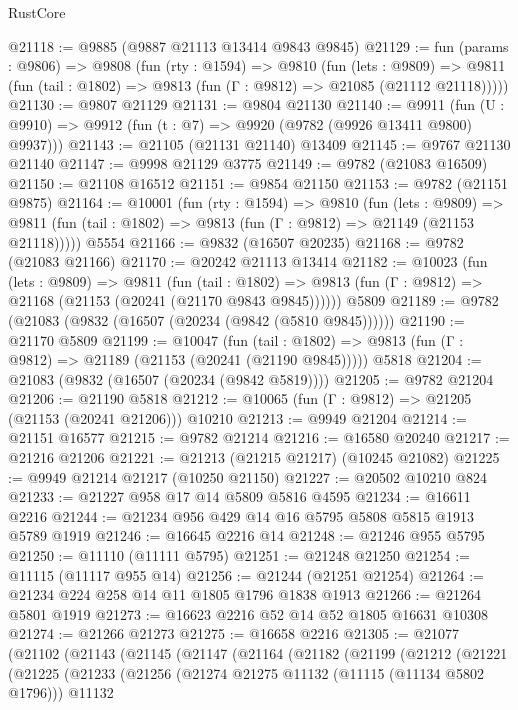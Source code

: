\begin{lexlean}{RustCore}
\begin{coremodule}
@21118 := @9885 (@9887 @21113 @13414 @9843 @9845)
@21129 := fun (params : @9806) =>
  @9808
    (fun (rty : @1594) =>
    @9810
      (fun (lets : @9809) =>
      @9811 (fun (tail : @1802) => @9813 (fun (Γ : @9812) => @21085 (@21112 @21118)))))
@21130 := @9807 @21129
@21131 := @9804 @21130
@21140 := @9911
    (fun (U : @9910) => @9912 (fun (t : @7) => @9920 (@9782 (@9926 @13411 @9800) @9937)))
@21143 := @21105 (@21131 @21140) @13409
@21145 := @9767 @21130 @21140
@21147 := @9998 @21129 @3775
@21149 := @9782 (@21083 @16509)
@21150 := @21108 @16512
@21151 := @9854 @21150
@21153 := @9782 (@21151 @9875)
@21164 := @10001
    (fun (rty : @1594) =>
    @9810
      (fun (lets : @9809) =>
      @9811 (fun (tail : @1802) => @9813 (fun (Γ : @9812) => @21149 (@21153 @21118)))))
    @5554
@21166 := @9832 (@16507 @20235)
@21168 := @9782 (@21083 @21166)
@21170 := @20242 @21113 @13414
@21182 := @10023
    (fun (lets : @9809) =>
    @9811
      (fun (tail : @1802) =>
      @9813 (fun (Γ : @9812) => @21168 (@21153 (@20241 (@21170 @9843 @9845))))))
    @5809
@21189 := @9782 (@21083 (@9832 (@16507 (@20234 (@9842 (@5810 @9845))))))
@21190 := @21170 @5809
@21199 := @10047
    (fun (tail : @1802) => @9813 (fun (Γ : @9812) => @21189 (@21153 (@20241 (@21190 @9845)))))
    @5818
@21204 := @21083 (@9832 (@16507 (@20234 (@9842 @5819))))
@21205 := @9782 @21204
@21206 := @21190 @5818
@21212 := @10065 (fun (Γ : @9812) => @21205 (@21153 (@20241 @21206))) @10210
@21213 := @9949 @21204
@21214 := @21151 @16577
@21215 := @9782 @21214
@21216 := @16580 @20240
@21217 := @21216 @21206
@21221 := @21213 (@21215 @21217) (@10245 @21082)
@21225 := @9949 @21214 @21217 (@10250 @21150)
@21227 := @20502 @10210 @824
@21233 := @21227 @958 @17 @14 @5809 @5816 @4595
@21234 := @16611 @2216
@21244 := @21234 @956 @429 @14 @16 @5795 @5808 @5815 @1913 @5789 @1919
@21246 := @16645 @2216 @14
@21248 := @21246 @955 @5795
@21250 := @11110 (@11111 @5795)
@21251 := @21248 @21250
@21254 := @11115 (@11117 @955 @14)
@21256 := @21244 (@21251 @21254)
@21264 := @21234 @224 @258 @14 @11 @1805 @1796 @1838 @1913
@21266 := @21264 @5801 @1919
@21273 := @16623 @2216 @52 @14 @52 @1805 @16631 @10308
@21274 := @21266 @21273
@21275 := @16658 @2216
@21305 := @21077
    (@21102
      (@21143
        (@21145
          (@21147
            (@21164
              (@21182
                (@21199
                  (@21212
                    (@21221
                      (@21225
                        (@21233
                          (@21256
                            (@21274 @21275 @11132 (@11115 (@11134 @5802 @1796)))
                            @11132

\end{coremodule}
\end{lexlean}
